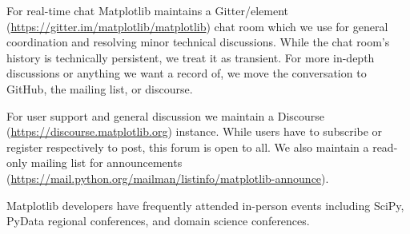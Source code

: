 \documentclass[12pt]{article}
\numberwithin{page}{section}
\begin{document}
For real-time chat Matplotlib maintains a Gitter/element
(\url{https://gitter.im/matplotlib/matplotlib}) chat room which we use for
general coordination and resolving minor technical discussions.  While the chat
room's history is technically persistent, we treat it as transient.  For more
in-depth discussions or anything we want a record of, we move the conversation
to GitHub, the mailing list, or discourse.

For user support and general discussion we maintain a Discourse
(\url{https://discourse.matplotlib.org}) instance.  While users have to
subscribe or register respectively to post, this forum is open to all.  We also
maintain a read-only mailing list for announcements
(\url{https://mail.python.org/mailman/listinfo/matplotlib-announce}).

Matplotlib developers have frequently attended in-person events including
SciPy, PyData regional conferences, and domain science conferences.

\newpage

\def\ref@jnl#1{{\rm#1}}
\end{document}

